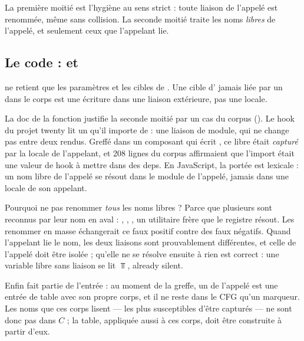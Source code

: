 La première moitié est l'hygiène au sens strict : toute liaison de l'appelé est renommée, même sans collision. La seconde moitié traite les noms \emph{libres} de l'appelé, et seulement ceux que l'appelant lie.

\subsection{Le code : \texorpdfstring{}{bound\_vars} et \texorpdfstring{}{callee\_rename\_map}}


 ne retient que les paramètres et les cibles de . Une cible d' jamais liée par un  dans le corps est une écriture dans une liaison extérieure, pas une locale.


La doc de la fonction justifie la seconde moitié par un cas du corpus (). Le hook  du projet twenty lit un  qu'il importe de  : une liaison de module, qui ne change pas entre deux rendus. Greffé dans un composant qui écrit , ce  libre était \emph{capturé} par la locale de l'appelant, et 208 lignes du corpus affirmaient que l'import était une valeur de hook à mettre dans des deps. En JavaScript, la portée est lexicale : un nom libre de l'appelé se résout dans le module de l'appelé, jamais dans une locale de son appelant.

Pourquoi ne pas renommer \emph{tous} les noms libres ? Parce que plusieurs sont reconnus par leur nom en aval : , , , un utilitaire frère que le registre résout. Les renommer en masse échangerait ce faux positif contre des faux négatifs. Quand l'appelant lie le nom, les deux liaisons sont prouvablement différentes, et celle de l'appelé doit être isolée ; qu'elle ne se résolve ensuite à rien est correct : une variable libre sans liaison se lit $\Top$, \og already silent\fg{}.

Enfin  fait partie de l'entrée : au moment de la greffe, un  de l'appelé est une entrée de table avec son propre corps, et il ne reste dans le CFG qu'un marqueur. Les noms que ces corps lisent --- les plus susceptibles d'être capturés --- ne sont donc pas dans $C$ ; la table, appliquée aussi à ces corps, doit être construite à partir d'eux.

